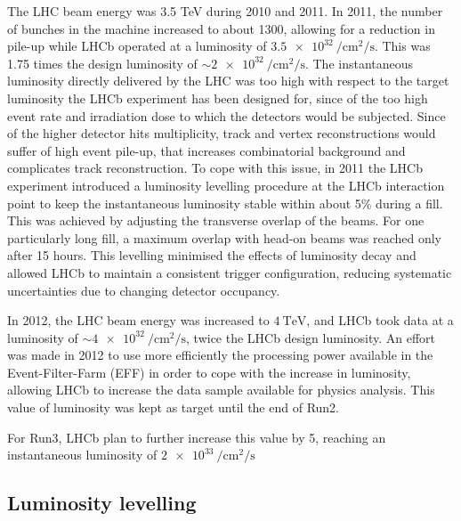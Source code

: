 The LHC beam energy was 3.5 TeV during 2010 and 2011. In 2011, the number of bunches in the machine increased to about 1300, allowing for a reduction in pile-up while LHCb operated at a luminosity of $\SI{3.5e32}{\per\centi\meter\squared\per\second}$. This was 1.75 times the design luminosity of $\sim \SI{2e32}{\per\centi\meter\squared\per\second}$. The instantaneous luminosity directly delivered by the LHC was too high with respect to the target luminosity the LHCb experiment has been designed for, since of the too high event rate and irradiation dose to which the detectors would be subjected. Since of the higher detector hits multiplicity, track and vertex reconstructions would suffer of high event pile-up, that increases combinatorial background and complicates track reconstruction.
To cope with this issue, in 2011 the LHCb experiment introduced a luminosity levelling procedure at the LHCb interaction point to keep the instantaneous luminosity stable within about 5\% during a fill. This was achieved by adjusting the transverse overlap of the beams. For one particularly long fill, a maximum overlap with head-on beams was reached only after 15 hours. This levelling minimised the effects of luminosity decay and allowed LHCb to maintain a consistent trigger configuration, reducing systematic uncertainties due to changing detector occupancy.

In 2012, the LHC beam energy was increased to $\SI{4}{\tera\eV}$, and LHCb took data at a luminosity of $\sim \SI{4e32}{\per\centi\meter\squared\per\second}$, twice the LHCb design luminosity. An effort was made in 2012 to use more efficiently the processing power available in the Event-Filter-Farm (EFF) in order to cope with the increase in luminosity, allowing LHCb to increase the data sample available for physics analysis. This value of luminosity was kept as target until the end of Run2. 


For Run3, LHCb plan to further increase this value by 5, reaching an instantaneous luminosity of $\SI{2e33}{\per\centi\meter\squared\per\second}$

\subsection{Luminosity levelling}\label{sec:lumi_levelling}

